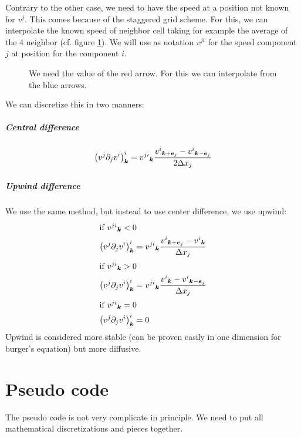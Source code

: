 \begin{remark}
  Contrary to the other case, we need to have the speed at a position not known for $v^{j}$. This comes because of the staggered grid scheme.
  For this, we can interpolate the known speed of neighbor cell taking for example the average of the 4 neighbor (cf. figure \ref{fixed:staggered_convection_upwind}).
  We will use as notation $v^{ji}$ for the speed component $j$ at position for the component $i$.
  
  \begin{figure}
    \caption{We need the value of the red arrow. For this we can interpolate from  the blue arrows.}
    \label{fixed:staggered_convection_upwind}
    \end{figure}
\end{remark}
We can discretize this in two manners:

\subparagraph{Central difference}
\begin{equation}
\left(v^{j}\partial_{j}v^{i}\right)^{i}_{{\boldsymbol {k}}}={v^{ji}}_{{\boldsymbol {k}}}\frac{{v^{i}}_{{\boldsymbol {k}}+{\boldsymbol {e}}_j}-{v^{i}}_{{\boldsymbol {k}}-{\boldsymbol {e}}_j}}{2\Delta x_{j}}
\end{equation}

\subparagraph{Upwind difference}

We use the same method, but instead to use center difference, we use upwind:
\begin{align}
\intertext{if ${v^{ji}}_{{\boldsymbol {k}}}<0$}
\left(v^{j}\partial_{j}v^{i}\right)^{i}_{{\boldsymbol {k}}}&={v^{ji}}_{{\boldsymbol {k}}}\frac{{v^{i}}_{{\boldsymbol {k}}+{\boldsymbol {e}}_j}-{v^{i}}_{{\boldsymbol {k}}}}{\Delta x_{j}}\\
\intertext{if ${v^{ji}}_{{\boldsymbol {k}}}>0$}
\left(v^{j}\partial_{j}v^{i}\right)^{i}_{{\boldsymbol {k}}}&={v^{ji}}_{{\boldsymbol {k}}}\frac{{v^{i}}_{{\boldsymbol {k}}}-{v^{i}}_{{\boldsymbol {k}}-{\boldsymbol {e}}_j}}{\Delta x_{j}}\\
\intertext{if ${v^{ji}}_{{\boldsymbol {k}}}=0$}
\left(v^{j}\partial_{j}v^{i}\right)^{i}_{{\boldsymbol {k}}}&=0
\end{align}
Upwind is considered more stable (can be proven easily in one dimension for burger's equation) but more diffusive.

\FloatBarrier
\section{Pseudo code}

The pseudo code is not very complicate in principle.
We need to put all mathematical discretizations and pieces together.

